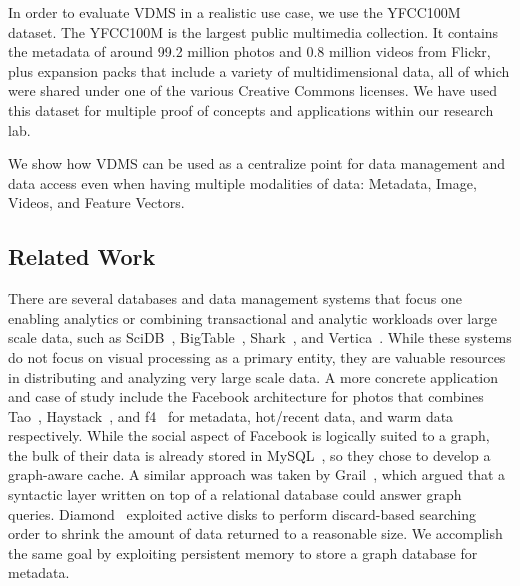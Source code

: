 In order to evaluate VDMS in a realistic use case,
we use the YFCC100M dataset\cite{Thomee_2016}.
The YFCC100M is the largest public multimedia collection.
It contains the metadata of around 99.2 million photos
and 0.8 million videos from Flickr,
plus expansion packs that include a variety of multidimensional data,
all of which were shared under one of the various Creative Commons licenses.
We have used this dataset for multiple proof of concepts and
applications within our research lab.

We show how VDMS can be used as a centralize point for data
management and data access even when having multiple modalities of data:
Metadata, Image, Videos, and Feature Vectors.

\subsection{Related Work}

There are several databases and data management systems that focus one enabling
analytics or combining transactional and analytic workloads over large
scale data, such as SciDB~\cite{brown2010overview},
BigTable~\cite{chang2008bigtable}, Shark~\cite{xin2013shark},
and Vertica~\cite{lamb2012vertica}.
While these systems do not focus on visual processing as a primary entity,
they are valuable resources in distributing and analyzing very large scale data.
A more concrete application and case of study include
the Facebook architecture for photos that combines Tao~\cite{tao},
Haystack~\cite{beaver2010finding}, and f4~\cite{muralidhar2014f4} for metadata,
hot/recent data, and warm data respectively.
While the social aspect of Facebook is logically suited to a graph,
the bulk of their data is already stored in MySQL~\cite{mysql},
so they chose to develop a graph-aware cache.
A similar approach was taken by Grail~\cite{fan2015case},
which argued that a syntactic layer written on top of a relational database
could answer graph queries.
Diamond~\cite{huston2004diamond,satyanarayanan2010unique} exploited active
disks to perform discard-based searching order to shrink the amount of data
returned to a reasonable size.
We accomplish the same goal by exploiting persistent memory to store a
graph database for metadata.
